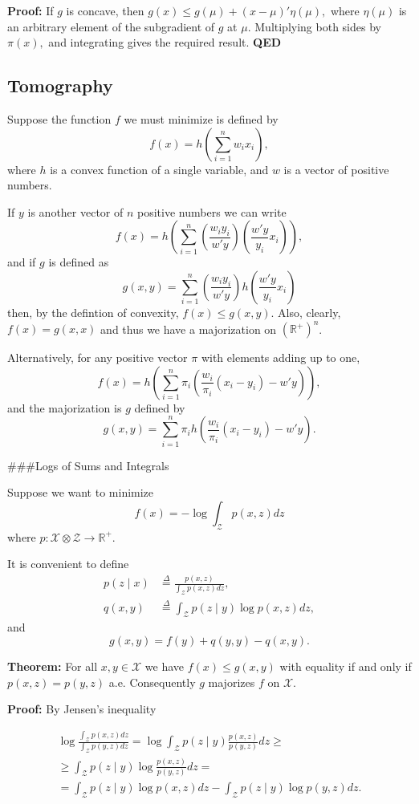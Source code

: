 \documentclass[
  12pt,
]{book}
\begin{document}
\textbf{Proof:} If \(g\) is concave, then
\(g(x)\leq g(\mu)+(x-\mu)'\eta(\mu),\)
where \(\eta(\mu)\) is an arbitrary element of the
subgradient of \(g\) at \(\mu.\) Multiplying both
sides by \(\pi(x),\) and integrating gives the
required result.
\textbf{QED}

\hypertarget{tomography}{%
\subsection{Tomography}\label{tomography}}

Suppose the function \(f\) we must minimize is defined by
\[
f(x)=h(\sum_{i=1}^n w_ix_i),
\]
where \(h\) is a convex function of a single variable, and \(w\) is a vector of positive numbers.

If \(y\) is another vector of \(n\) positive numbers we can write
\[
f(x)=h\left(\sum_{i=1}^n \left(\frac{w_iy_i}{w'y}\right)\left(\frac{w'y}{y_i}x_i\right)\right),
\]
and if \(g\) is defined as
\[
g(x,y)=\sum_{i=1}^n\left(\frac{w_iy_i}{w'y}\right)h\left(\frac{w'y}{y_i}x_i\right)
\]
then, by the defintion of convexity, \(f(x)\leq g(x,y)\). Also, clearly, \(f(x)=g(x,x)\) and thus we have a majorization
on \((\mathbb{R}^+)^n\).

Alternatively, for any positive vector \(\pi\) with elements adding up to one,
\[
f(x)=h\left(\sum_{i=1}^n\pi_i\left(\frac{w_i}{\pi_i}(x_i-y_i)-w'y\right)\right),
\]
and the majorization is \(g\) defined by
\[
g(x,y)=\sum_{i=1}^n\pi_ih\left(\frac{w_i}{\pi_i}(x_i-y_i)-w'y\right).
\]

\#\#\#Logs of Sums and Integrals

Suppose we want to minimize
\[
f(x)=-\log\int_{\mathcal{Z}} p(x,z)dz
\]
where \(p:\mathcal{X}\otimes\mathcal{Z}\rightarrow\mathbb{R}^+\).

It is convenient to define
\begin{align*}
p(z\mid x)&\mathop{=}\limits^{\Delta}\frac{p(x,z)}{\int_\mathcal{Z}p(x,z)dz},\\
q(x,y)&\mathop{=}\limits^{\Delta}\int_\mathcal{Z}p(z\mid y)\log p(x,z)dz,
\end{align*}
and
\[
g(x,y)=f(y)+q(y,y)-q(x,y).
\]

\textbf{Theorem:}
For all \(x,y\in\mathcal{X}\) we have \(f(x)\leq g(x,y)\)
with equality if and only if \(p(x,z)=p(y,z)\) a.e.
Consequently \(g\) majorizes \(f\) on \(\mathcal{X}\).

\textbf{Proof:}
By Jensen's inequality

\begin{multline*}
\log\frac{\int_\mathcal{Z} p(x,z)dz}{\int_\mathcal{Z} p(y,z)dz}=
\log\int_\mathcal{Z} p(z\mid y)\frac{p(x,z)}{p(y,z)}dz
\geq
\\
\geq\int_\mathcal{Z} p(z\mid y)\log\frac{p(x,z)}{p(y,z)}dz
=\\
=\int_\mathcal{Z}p(z\mid y)\log{p(x,z)}dz
-\int_\mathcal{Z}p(z\mid y)\log{p(y,z)}dz.
\end{multline*}
\end{document}
